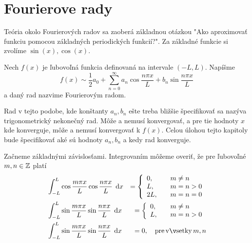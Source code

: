 \section{Fourierove rady}

Teória okolo Fourierových radov sa zaoberá základnou otázkou "Ako
aproximovať funkciu pomocou základných periodických funkcií?".
Za základné funkcie si zvolíme $\sin(x), \cos(x)$.

\begin{definicia} Nech $f(x)$ je ľubovoľná funkcia definovaná na
intervale $(-L,L)$. Napíšme
    \begin{equation}
        f(x) \sim \frac{1}{2} a_0 + \sum_{n=0}^{\infty} a_n
        \cos\frac{n \pi x}{L} + b_n \sin\frac{n \pi x}{L}
    \end{equation}
a daný rad nazvime Fourierovým radom.
\end{definicia}

Rad v tejto podobe, kde konštanty $a_n, b_n$ ešte treba bližšie
špecifikovať sa nazýva trigonometrický nekonečný rad. Môže a nemusí
konvergovať, a pre tie hodnoty $x$ kde konverguje, môže a nemusí
konvergovať k $f(x)$. Celou úlohou tejto kapitoly bude špecifikovať
aké sú hodnoty $a_n, b_n$ a kedy rad konverguje.

Začneme základnými závislosťami. Integrovaním môžeme overiť, že pre
ľubovoľné $m,n \in \mathbb{Z}$ platí
\begin{eqnarray}
    &\displaystyle \int_{-L}^{L} \cos \frac{m \pi x}{L} 
     \cos\frac{n \pi x}{L}\, \dd x &= 
     \left\{
        \begin{array}{l l}
            0,& \quad m\not=n \\
            L,& \quad m=n>0 \\
            2L,& \quad m=n=0
        \end{array}
     \right. \nonumber\\
    &\displaystyle \int_{-L}^{L} \sin \frac{m \pi x}{L} 
     \sin\frac{n \pi x}{L}\, \dd x &= 
     \left\{
        \begin{array}{l l}
            0,& \quad m\not=n \\
            L,& \quad m=n > 0
        \end{array}    
     \right. \nonumber\\
    &\displaystyle \int_{-L}^{L} \sin \frac{m \pi x}{L}
     \sin \frac{n \pi x}{L}\, \dd x &= 0,
        \quad {\rm pre\, všetky\,} m,n
        \label{eq:basic_orthogonality}
\end{eqnarray}

